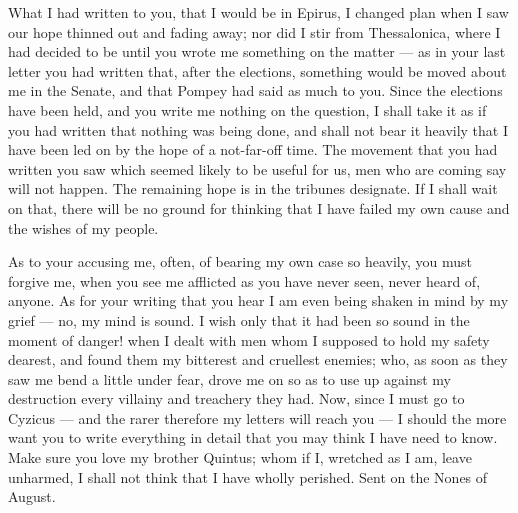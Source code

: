 

 What I had written to you, that I would be in Epirus, I changed plan when I saw our hope thinned out and fading away; nor did I stir from Thessalonica, where I had decided to be until you wrote me something on the matter --- as in your last letter you had written that, after the elections, something would be moved about me in the Senate, and that Pompey had said as much to you. Since the elections have been held, and you write me nothing on the question, I shall take it as if you had written that nothing was being done, and shall not bear it heavily that I have been led on by the hope of a not-far-off time. The movement that you had written you saw which seemed likely to be useful for us, men who are coming say will not happen. The remaining hope is in the tribunes designate. If I shall wait on that, there will be no ground for thinking that I have failed my own cause and the wishes of my people.

 As to your accusing me, often, of bearing my own case so heavily, you must forgive me, when you see me afflicted as you have never seen, never heard of, anyone. As for your writing that you hear I am even being shaken in mind by my grief --- no, my mind is sound. I wish only that it had been so sound in the moment of danger! when I dealt with men whom I supposed to hold my safety dearest, and found them my bitterest and cruellest enemies; who, as soon as they saw me bend a little under fear, drove me on so as to use up against my destruction every villainy and treachery they had. Now, since I must go to Cyzicus --- and the rarer therefore my letters will reach you --- I should the more want you to write everything in detail that you may think I have need to know. Make sure you love my brother Quintus; whom if I, wretched as I am, leave unharmed, I shall not think that I have wholly perished. Sent on the Nones of August.
